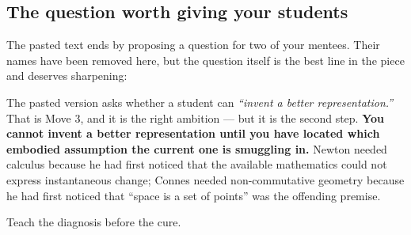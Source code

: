 \subsection{The question worth giving your students}

The pasted text ends by proposing a question for two of your mentees. Their names have been removed
here, but the question itself is the best line in the piece and deserves sharpening:

\begin{center}
\end{center}
\vspace{2pt}
\noindent The pasted version asks whether a student can \emph{``invent a better representation.''}
That is Move 3, and it is the right ambition --- but it is the second step. \textbf{You cannot invent
a better representation until you have located which embodied assumption the current one is smuggling
in.} Newton needed calculus because he had first noticed that the available mathematics could not
express instantaneous change; Connes needed non-commutative geometry because he had first noticed
that ``space is a set of points'' was the offending premise.

Teach the diagnosis before the cure.
